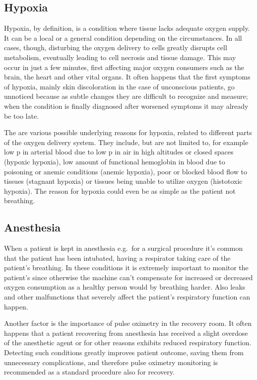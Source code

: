 \subsection{Hypoxia}

Hypoxia, by definition, is a condition where tissue lacks adequate oxygen supply. It can be a local or a general condition depending on the circumstances. In all cases, though, disturbing the oxygen delivery to cells greatly disrupts cell metabolism, eventually leading to cell necrosis and tissue damage. This may occur in just a few minutes, first affecting major oxygen consumers such as the brain, the heart and other vital organs. It often happens that the first symptoms of hypoxia, mainly skin discoloration in the case of unconscious patients, go unnoticed because as subtle changes they are difficult to recognize and measure; when the condition is finally diagnosed after worsened symptoms it may already be too late.

The are various possible underlying reasons for hypoxia, related to different parts of the oxygen delivery system. They include, but are not limited to, for example low p in arterial blood due to low p in air in high altitudes or closed spaces (hypoxic hypoxia), low amount of functional hemoglobin in blood due to poisoning or anemic conditions (anemic hypoxia), poor or blocked blood flow to tissues (stagnant hypoxia) or tissues being unable to utilize oxygen (histotoxic hypoxia). The reason for hypoxia could even be as simple as the patient not breathing.\ \cite{Tortora2000, Webster1997}

\subsection{Anesthesia}

When a patient is kept in anesthesia e.g.\ for a surgical procedure it's common that the patient has been intubated, having a respirator taking care of the patient's breathing. In these conditions it is extremely important to monitor the patient's \spo since otherwise the machine can't compensate for increased or decreased oxygen consumption as a healthy person would by breathing harder. Also leaks and other malfunctions that severely affect the patient's respiratory function can happen.\ \cite{Pierce1998}

Another factor is the importance of pulse oximetry in the recovery room. It often happens that a patient recovering from anesthesia has received a slight overdose of the anesthetic agent or for other reasons exhibits reduced respiratory function. Detecting such conditions greatly improves patient outcome, saving them from unnecessary complications, and therefore pulse oximetry monitoring is recommended as a standard procedure also for recovery.\ \cite{Morris1987}